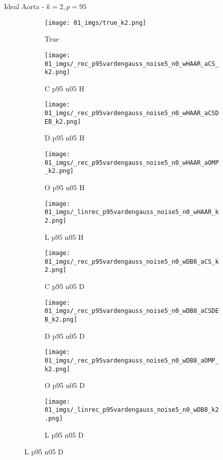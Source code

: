 \begin{frame}{Ideal Aorta - $k=2,p=95$}{}
\begin{figure}
\begin{subfigure}{0.1\textwidth}
\texttt{[image: 01\_imgs/true\_k2.png]}
\caption*{\Tiny True}
\end{subfigure}
\begin{subfigure}{0.1\textwidth}
\texttt{[image: 01\_imgs/\_rec\_p95vardengauss\_noise5\_n0\_wHAAR\_aCS\_k2.png]}
\caption*{\Tiny C p95 n05 H}
\end{subfigure}
\begin{subfigure}{0.1\textwidth}
\texttt{[image: 01\_imgs/\_rec\_p95vardengauss\_noise5\_n0\_wHAAR\_aCSDEB\_k2.png]}
\caption*{\Tiny D p95 n05 H}
\end{subfigure}
\begin{subfigure}{0.1\textwidth}
\texttt{[image: 01\_imgs/\_rec\_p95vardengauss\_noise5\_n0\_wHAAR\_aOMP\_k2.png]}
\caption*{\Tiny O p95 n05 H}
\end{subfigure}
\begin{subfigure}{0.1\textwidth}
\texttt{[image: 01\_imgs/\_linrec\_p95vardengauss\_noise5\_n0\_wHAAR\_k2.png]}
\caption*{\Tiny L p95 n05 H}
\end{subfigure}
\begin{subfigure}{0.1\textwidth}
\texttt{[image: 01\_imgs/\_rec\_p95vardengauss\_noise5\_n0\_wDB8\_aCS\_k2.png]}
\caption*{\Tiny C p95 n05 D}
\end{subfigure}
\begin{subfigure}{0.1\textwidth}
\texttt{[image: 01\_imgs/\_rec\_p95vardengauss\_noise5\_n0\_wDB8\_aCSDEB\_k2.png]}
\caption*{\Tiny D p95 n05 D}
\end{subfigure}
\begin{subfigure}{0.1\textwidth}
\texttt{[image: 01\_imgs/\_rec\_p95vardengauss\_noise5\_n0\_wDB8\_aOMP\_k2.png]}
\caption*{\Tiny O p95 n05 D}
\end{subfigure}
\begin{subfigure}{0.1\textwidth}
\texttt{[image: 01\_imgs/\_linrec\_p95vardengauss\_noise5\_n0\_wDB8\_k2.png]}
\caption*{\Tiny L p95 n05 D}
\end{subfigure}

\vspace{5pt}


\end{figure}
\end{frame}

